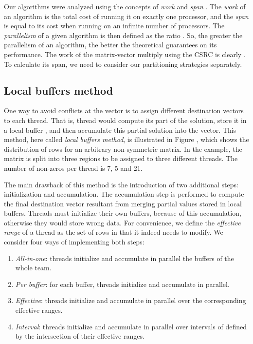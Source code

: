 \documentclass[11pt]{article}
\begin{document}
Our algorithms were analyzed using the concepts of \textit{work} and
\textit{span} \cite[Ch.~27]{CLRS09a}.  The \textit{work}  of an
algorithm is the total cost of running it on exactly one processor, and the
\textit{span}  is equal to its cost when running on an infinite
number of processors.  The \textit{parallelism} of a given algorithm is then
defined as the ratio .  So, the greater the parallelism of
an algorithm, the better the theoretical guarantees on its performance.  The
work of the matrix-vector multiply using the CSRC is clearly .  To
calculate its span, we need to consider our partitioning strategies
separately.

\subsection{Local buffers method}

One way to avoid conflicts at the  vector is to assign different
destination vectors to each thread.  That is, thread  would compute its
part of the solution, store it in a local buffer , and then accumulate
this partial solution into the  vector.  This method, here called
\textit{local buffers method}, is illustrated in
Figure , which shows the distribution of rows for an
arbitrary non-symmetric  matrix.  In the example, the matrix is
split into three regions to be assigned to three different threads.  The number of non-zeros per thread is 7, 5 and
21.

The main drawback of this method is the introduction of two additional steps: initialization and accumulation.
The accumulation step is performed to compute the final destination vector resultant from merging partial values stored in local buffers.
Threads must initialize their own buffers, because of this accumulation, otherwise they would store wrong data.
For convenience, we define the \textit{effective range} of a thread as the set of rows in  that it indeed needs to modify.
We consider four ways of implementing both steps:

\begin{enumerate}

\item \textit{All-in-one}: threads initialize and accumulate in parallel the buffers of the whole team.

\item \textit{Per buffer}: for each buffer, threads initialize and accumulate in parallel.

\item \textit{Effective}: threads initialize and accumulate in parallel over the corresponding effective ranges.

\item \textit{Interval}: threads initialize and accumulate in parallel over intervals of  defined by the intersection of their effective ranges.

\end{enumerate}
\end{document}

